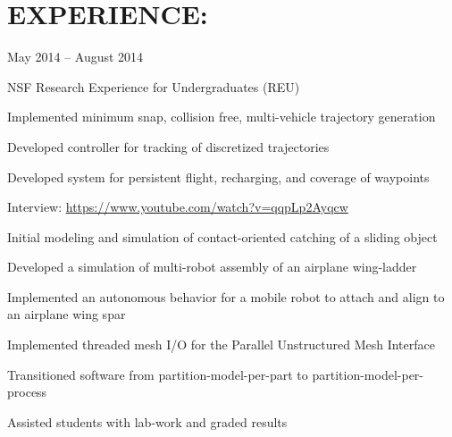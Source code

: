 \section{EXPERIENCE:}
  {May 2014 -- August 2014}
{
  \item NSF Research Experience for Undergraduates (REU)
  \item Implemented minimum snap, collision free, multi-vehicle trajectory
    generation
  \item Developed controller for tracking of discretized trajectories
  \item Developed system for persistent flight, recharging, and coverage of waypoints
  \item Interview: \url{https://www.youtube.com/watch?v=qqpLp2Ayqcw}
}
{
  \item Initial modeling and simulation of contact-oriented catching of a sliding object
}
{
  \item Developed a simulation of multi-robot assembly of an airplane wing-ladder
  \item Implemented an autonomous behavior for a mobile robot to attach and
    align to an airplane wing spar
}
{
  \item Implemented threaded mesh I/O for the Parallel Unstructured Mesh Interface
  \item Transitioned software from partition-model-per-part to partition-model-per-process
}
{
  \item Assisted students with lab-work and graded results
}
